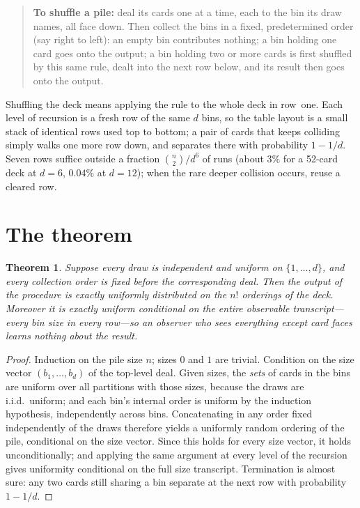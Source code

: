 \documentclass[11pt]{article}
\newtheorem{theorem}{Theorem}
\begin{document}
\begin{quote}
\textbf{To shuffle a pile:} deal its cards one at a time, each to the
bin its draw names, all face down. Then collect the bins in a fixed,
predetermined order (say right to left): an empty bin contributes
nothing; a bin holding one card goes onto the output; a bin holding two
or more cards is first shuffled by this same rule, dealt into the next
row below, and its result then goes onto the output.
\end{quote}

Shuffling the deck means applying the rule to the whole deck in
row~one. Each level of recursion is a fresh row of the same $d$ bins,
so the table layout is a small stack of identical rows used top to
bottom; a pair of cards that keeps colliding simply walks one more row
down, and separates there with probability $1 - 1/d$. Seven rows
suffice outside a fraction $\binom{n}{2}/d^{6}$ of runs (about $3\%$
for a 52-card deck at $d=6$, $0.04\%$ at $d=12$); when the rare deeper
collision occurs, reuse a cleared row.

\section{The theorem}

\begin{theorem}
Suppose every draw is independent and uniform on $\{1,\dots,d\}$, and
every collection order is fixed before the corresponding deal. Then the
output of the procedure is exactly uniformly distributed on the $n!$
orderings of the deck. Moreover it is exactly uniform conditional on the
entire observable transcript---every bin size in every row---so an
observer who sees everything except card faces learns nothing about the
result.
\end{theorem}

\begin{proof}
Induction on the pile size $n$; sizes $0$ and $1$ are trivial. Condition
on the size vector $(b_1,\dots,b_d)$ of the top-level deal. Given sizes,
the \emph{sets} of cards in the bins are uniform over all partitions
with those sizes, because the draws are i.i.d.\ uniform; and each bin's
internal order is uniform by the induction hypothesis, independently
across bins. Concatenating in any order fixed independently of the
draws therefore yields a uniformly random ordering of the pile,
conditional on the size vector. Since this holds for every size vector,
it holds unconditionally; and applying the same argument at every level
of the recursion gives uniformity conditional on the full size
transcript. Termination is almost sure: any two cards still sharing a
bin separate at the next row with probability $1 - 1/d$.
\end{proof}
\end{document}
